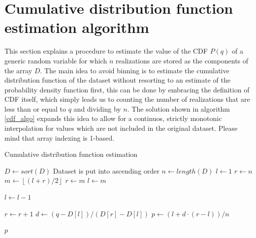 \documentclass[10pt,final]{siamltex}
\begin{document}
\section{Cumulative distribution function estimation algorithm}
%
This section explains a procedure to estimate the value of the CDF $P(q)$ of a generic random variable for which $n$ realizations are stored as the components of the array $D$.
The main idea to avoid binning is to estimate the cumulative distribution function of the dataset without resorting to an estimate of the probability density function first, this can be done by embracing the definition of CDF itself, which simply leads us to counting the number of realizations that are less than or equal to $q$ and dividing by $n$. The solution shown in algorithm \ref{cdf_algo} expands this idea to allow for a continuos, strictly monotonic interpolation for values which are not included in the original dataset. Please mind that array indexing is 1-based.

\begin{algorithm}
  \caption{Cumulative distribution function estimation}
  \label{cdf_algo}
  \begin{algorithmic}[1]
    \State $D \gets sort(D)$
    \Comment Dataset is put into ascending order
    \State $n \gets length(D)$
    \State $l \gets 1$
    \State $r \gets n$
    \State $m \gets \left \lfloor{(l+r)/2}\right \rfloor$
    \State $r \gets m$
    \Else
    \State $l \gets m$
    \EndIf
    \EndWhile


    \State $l \gets l - 1$
    \EndWhile

    \State $r \gets r + 1$
    \EndWhile
    \State $d \gets (q-D[l])/(D[r]-D[l])$
    \State $p \gets (l + d \cdot (r - l))/n $

    \EndIf

    \State \Return $p$
    \EndFunction
  \end{algorithmic}
\end{algorithm}
\end{document}

